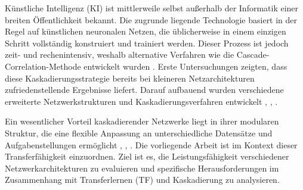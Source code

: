 Künstliche Intelligenz (KI) ist mittlerweile selbst außerhalb der Informatik einer breiten Öffentlichkeit bekannt. Die zugrunde liegende 
Technologie basiert in der Regel auf künstlichen neuronalen Netzen, die üblicherweise in einem einzigen Schritt vollständig konstruiert und 
trainiert werden. Dieser Prozess ist jedoch zeit- und rechenintensiv, weshalb alternative Verfahren wie die Cascade-Correlation-Methode 
entwickelt wurden \cite{cascor}. Erste Untersuchungen zeigten, dass diese Kaskadierungsstrategie bereits bei kleineren Netzarchitekturen 
zufriedenstellende Ergebnisse liefert. Darauf aufbauend wurden verschiedene erweiterte Netzwerkstrukturen und Kaskadierungsverfahren 
entwickelt \cite{cascade_network_architectures}, \cite{Constructive_Cascade}, \cite{deep_cascade_learning}.

Ein wesentlicher Vorteil kaskadierender Netzwerke liegt in ihrer modularen Struktur, die eine flexible Anpassung an unterschiedliche 
Datensätze und Aufgabenstellungen ermöglicht \cite{phd_deep_cascade}, \cite{transfer_learning}, \cite{survey_transfer}. Die vorliegende 
Arbeit ist im Kontext dieser Transferfähigkeit einzuordnen. Ziel ist es, die Leistungsfähigkeit verschiedener Netzwerkarchitekturen zu 
evaluieren und spezifische Herausforderungen im Zusammenhang mit Transferlernen (TF) und Kaskadierung zu analysieren.
